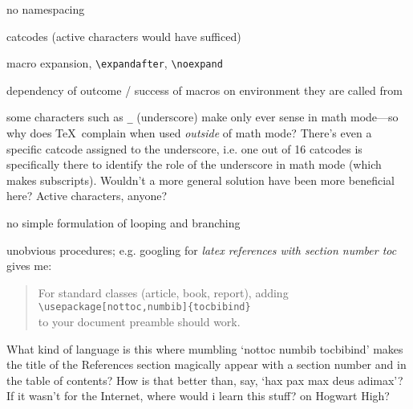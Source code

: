 no namespacing

catcodes (active characters would have sufficed)

macro expansion,
\verb#\expandafter#, \verb#\noexpand#

dependency of outcome / success of macros on environment they are called from

some characters such as \verb#_# (underscore) make only ever sense in math mode---so why does \TeX\ complain when used
{\em outside} of math mode? There's even a specific catcode assigned to the underscore, i.e. one out of
16 catcodes is specifically there to identify the role of the underscore in math mode (which makes subscripts).
Wouldn't a more general solution have been more beneficial here? Active characters, anyone?

no simple formulation of looping and branching

unobvious procedures; e.g. googling for {\em latex references with section number toc} gives me:


\begin{quote}
For standard classes (article, book, report), adding\\
\verb#\usepackage[nottoc,numbib]{tocbibind}#\\
to your document preamble should work.
\end{quote}

What kind of language is this where mumbling `nottoc numbib tocbibind' makes the title of the References
section magically appear with a section number and in the table of contents? How is that better than, say,
`hax pax max deus adimax'\thinspace? If it wasn't for the Internet, where would i learn this stuff? on Hogwart High?





